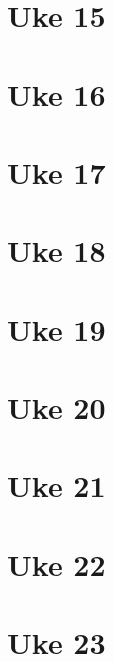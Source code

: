 \documentclass{article}
\begin{document}
  \section{Uke 15}
  \section{Uke 16}
  \section{Uke 17}
  \section{Uke 18}
  \section{Uke 19}
  \section{Uke 20}
  \section{Uke 21}
  \section{Uke 22}
  \section{Uke 23}
\end{document}
